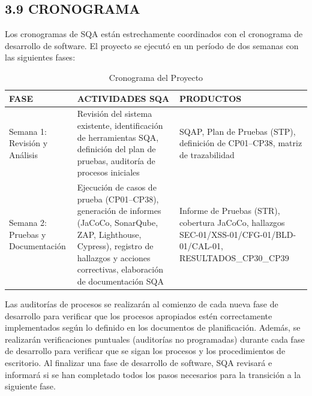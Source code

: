 \subsection{3.9 CRONOGRAMA}
Los cronogramas de SQA están estrechamente coordinados con el cronograma de desarrollo de software. El proyecto se ejecutó en un período de dos semanas con las siguientes fases:

\begin{table}[H]
\centering
\caption{Cronograma del Proyecto}
\label{tab:schedule}
\begin{tabular}{|p{2.5cm}|p{4cm}|p{6.5cm}|}
\hline
\textbf{FASE} & \textbf{ACTIVIDADES SQA} & \textbf{PRODUCTOS} \\
\hline
Semana 1: Revisión y Análisis & Revisión del sistema existente, identificación de herramientas SQA, definición del plan de pruebas, auditoría de procesos iniciales & SQAP, Plan de Pruebas (STP), definición de CP01--CP38, matriz de trazabilidad \\
\hline
Semana 2: Pruebas y Documentación & Ejecución de casos de prueba (CP01--CP38), generación de informes (JaCoCo, SonarQube, ZAP, Lighthouse, Cypress), registro de hallazgos y acciones correctivas, elaboración de documentación SQA & Informe de Pruebas (STR), cobertura JaCoCo, hallazgos SEC-01/XSS-01/CFG-01/BLD-01/CAL-01, RESULTADOS\_CP30\_CP39 \\
\hline
\end{tabular}
\end{table}

Las auditorías de procesos se realizarán al comienzo de cada nueva fase de desarrollo para verificar que los procesos apropiados estén correctamente implementados según lo definido en los documentos de planificación. Además, se realizarán verificaciones puntuales (auditorías no programadas) durante cada fase de desarrollo para verificar que se sigan los procesos y los procedimientos de escritorio. Al finalizar una fase de desarrollo de software, SQA revisará e informará si se han completado todos los pasos necesarios para la transición a la siguiente fase.
